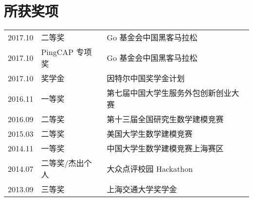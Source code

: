 \documentclass[]{deedy-resume-openfont}
\begin{document}
\begin{minipage}[t]{0.68\textwidth}
\section{所获奖项}
\begin{tabular}{rll}
2017.10     & 二等奖  & Go 基金会中国黑客马拉松 \\
2017.10     & PingCAP 专项奖 & Go 基金会中国黑客马拉松 \\
2017.10     & 奖学金  & 因特尔中国奖学金计划 \\
2016.11	    & 一等奖  & 第七届中国大学生服务外包创新创业大赛 \\
2016.09	    & 二等奖  & 第十三届全国研究生数学建模竞赛 \\
2015.03	    & 二等奖  & 美国大学生数学建模竞赛 \\
2014.11     & 一等奖 & 中国大学生数学建模竞赛上海赛区 \\
2014.07	    & 二等奖/杰出个人  & 大众点评校园 Hackathon \\
2013.09     & 三等奖 & 上海交通大学奖学金 \\
\end{tabular}
\sectionsep\end{minipage}
\end{document}
